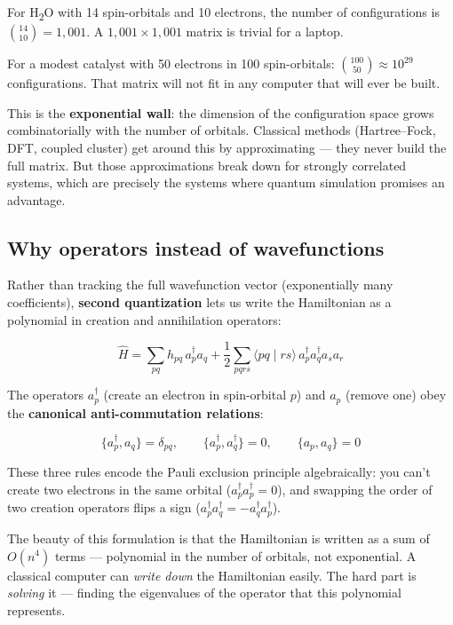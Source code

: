 \documentclass[
  11pt,
  oneside]{book}
\begin{document}
For H\textsubscript{2}O with 14 spin-orbitals and 10 electrons, the number of
configurations is \(\binom{14}{10} = 1{,}001\). A
\(1{,}001 \times 1{,}001\) matrix is trivial for a laptop.

For a modest catalyst with 50 electrons in 100 spin-orbitals:
\(\binom{100}{50} \approx 10^{29}\) configurations. That matrix will not
fit in any computer that will ever be built.

This is the \textbf{exponential wall}: the dimension of the
configuration space grows combinatorially with the number of orbitals.
Classical methods (Hartree--Fock, DFT, coupled cluster) get around this
by approximating --- they never build the full matrix. But those
approximations break down for strongly correlated systems, which are
precisely the systems where quantum simulation promises an advantage.

\subsection{Why operators instead of
wavefunctions}\label{why-operators-instead-of-wavefunctions}

Rather than tracking the full wavefunction vector (exponentially many
coefficients), \textbf{second quantization} lets us write the
Hamiltonian as a polynomial in creation and annihilation operators:

\[\hat{H} = \sum_{pq} h_{pq}\, a_p^\dagger a_q + \frac{1}{2}\sum_{pqrs} \langle pq \mid rs\rangle\, a_p^\dagger a_q^\dagger a_s a_r\]

The operators \(a_p^\dagger\) (create an electron in spin-orbital \(p\))
and \(a_p\) (remove one) obey the \textbf{canonical anti-commutation
relations}:

\[\{a_p^\dagger, a_q\} = \delta_{pq}, \qquad \{a_p^\dagger, a_q^\dagger\} = 0, \qquad \{a_p, a_q\} = 0\]

These three rules encode the Pauli exclusion principle algebraically:
you can't create two electrons in the same orbital
(\(a_p^\dagger a_p^\dagger = 0\)), and swapping the order of two
creation operators flips a sign
(\(a_p^\dagger a_q^\dagger = -a_q^\dagger a_p^\dagger\)).

The beauty of this formulation is that the Hamiltonian is written as a
sum of \(O(n^4)\) terms --- polynomial in the number of orbitals, not
exponential. A classical computer can \emph{write down} the Hamiltonian
easily. The hard part is \emph{solving} it --- finding the eigenvalues
of the operator that this polynomial represents.
\end{document}

